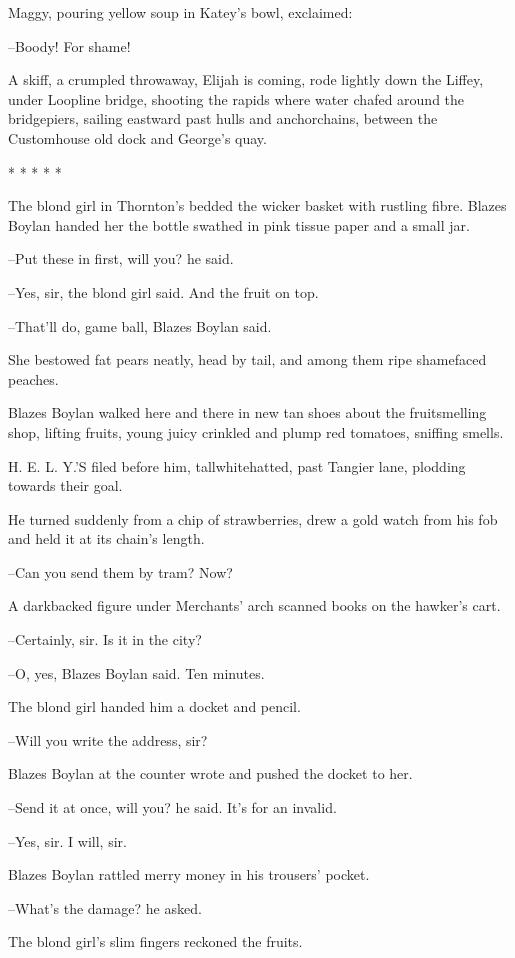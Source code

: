 Maggy, pouring yellow soup in Katey's bowl, exclaimed:

--Boody! For shame!

A skiff, a crumpled throwaway, Elijah is coming, rode lightly down
the Liffey, under Loopline bridge, shooting the rapids where water chafed
around the bridgepiers, sailing eastward past hulls and anchorchains,
between the Customhouse old dock and George's quay.

    * * * * *


The blond girl in Thornton's bedded the wicker basket with rustling
fibre. Blazes Boylan handed her the bottle swathed in pink tissue paper
and a small jar.

--Put these in first, will you? he said.

--Yes, sir, the blond girl said. And the fruit on top.

--That'll do, game ball, Blazes Boylan said.

She bestowed fat pears neatly, head by tail, and among them ripe
shamefaced peaches.

Blazes Boylan walked here and there in new tan shoes about the
fruitsmelling shop, lifting fruits, young juicy crinkled and plump red
tomatoes, sniffing smells.

H. E. L. Y.'S filed before him, tallwhitehatted, past Tangier lane,
plodding towards their goal.

He turned suddenly from a chip of strawberries, drew a gold watch
from his fob and held it at its chain's length.

--Can you send them by tram? Now?

A darkbacked figure under Merchants' arch scanned books on the
hawker's cart.

--Certainly, sir. Is it in the city?

--O, yes, Blazes Boylan said. Ten minutes.

The blond girl handed him a docket and pencil.

--Will you write the address, sir?

Blazes Boylan at the counter wrote and pushed the docket to her.

--Send it at once, will you? he said. It's for an invalid.

--Yes, sir. I will, sir.

Blazes Boylan rattled merry money in his trousers' pocket.

--What's the damage? he asked.

The blond girl's slim fingers reckoned the fruits.

